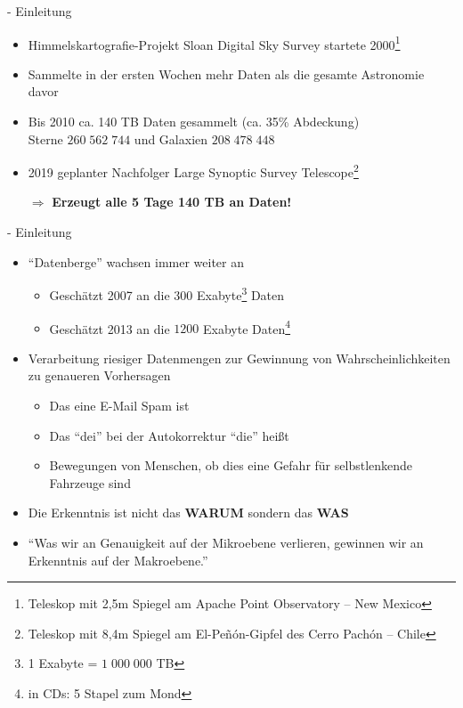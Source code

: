 \documentclass[fleqn,11pt,aspectratio=43]{beamer}
\begin{document}
\begin{frame}{\insertsectionhead - Einleitung \cite{mayer2014big} \cite{wu2014data}}
\begin{itemize}
\item Himmelskartografie-Projekt Sloan Digital Sky Survey startete 2000\footnote{Teleskop mit 2,5m Spiegel am Apache Point Observatory -- New Mexico}
\item Sammelte in der ersten Wochen mehr Daten als die gesamte Astronomie davor\\ \vspace{1em}

\item Bis 2010 ca. 140 TB Daten gesammelt (ca. 35\% Abdeckung)\\
		Sterne	$260\;562\;744$ und Galaxien $208\;478\;448$ \cite{sdss3_scope:Online}
\item 2019 geplanter Nachfolger Large Synoptic Survey Telescope\footnote{Teleskop mit 8,4m Spiegel am El-Peñón-Gipfel des Cerro Pachón -- Chile} \\ \vspace{1em}
\item[$\Rightarrow$] \textbf{Erzeugt alle 5 Tage 140 TB an Daten!}
\end{itemize}
\end{frame}

\begin{frame}{\insertsectionhead - Einleitung \cite{mayer2014big} \cite{wu2014data}}
\begin{itemize}
\item \enquote{Datenberge} wachsen immer weiter an
\begin{itemize}
\item Geschätzt 2007 an die $300$ Exabyte\footnote{1 Exabyte = $1\;000\;000$ TB} Daten 
\item Geschätzt 2013 an die $1200$ Exabyte Daten\footnote{in CDs: 5 Stapel zum Mond}
\end{itemize}
\item Verarbeitung riesiger Datenmengen zur Gewinnung von Wahrscheinlichkeiten
zu genaueren Vorhersagen
\begin{itemize}
\item Das eine E-Mail Spam ist
\item Das \enquote{dei} bei der Autokorrektur \enquote{die} heißt
\item Bewegungen von Menschen, ob dies eine Gefahr für selbstlenkende Fahrzeuge sind
\end{itemize}
\item Die Erkenntnis ist nicht das \textbf{WARUM} sondern das \textbf{WAS} 
\item \enquote{Was wir an
Genauigkeit auf der Mikroebene verlieren, gewinnen wir an Erkenntnis
auf der Makroebene.} \cite{mayer2014big}
\end{itemize}
\end{frame}
\end{document}
